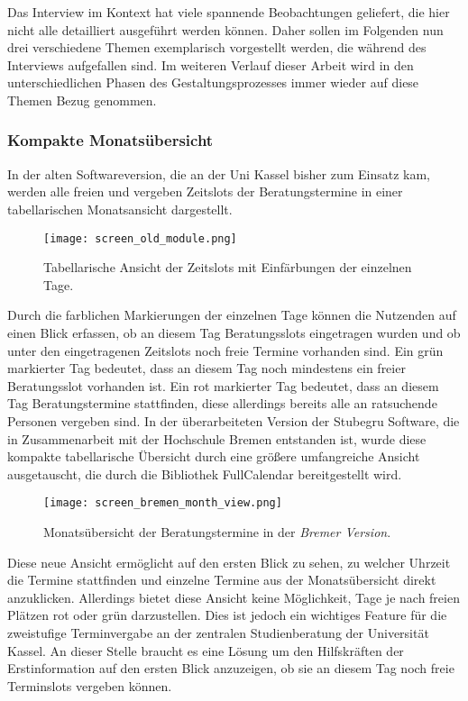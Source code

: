 Das Interview im Kontext hat viele spannende Beobachtungen geliefert, die hier
nicht alle detailliert ausgeführt werden können. Daher sollen im Folgenden nun
drei verschiedene Themen exemplarisch vorgestellt werden, die während des
Interviews aufgefallen sind. Im weiteren Verlauf dieser Arbeit wird in den
unterschiedlichen Phasen des Gestaltungsprozesses immer wieder auf diese Themen
Bezug genommen.

\subsubsection{Kompakte Monatsübersicht}
In der alten Softwareversion, die an der Uni Kassel bisher zum Einsatz kam,
werden alle freien und vergeben Zeitslots der Beratungstermine in einer
tabellarischen Monatsansicht dargestellt.

\begin{figure}[H]
    \caption{Tabellarische Ansicht der Zeitslots mit Einfärbungen der einzelnen Tage.}
    \centering
    \texttt{[image: screen\_old\_module.png]}
\end{figure}

Durch die farblichen Markierungen der einzelnen Tage können die Nutzenden auf einen
Blick erfassen, ob an diesem Tag Beratungsslots eingetragen wurden und ob unter
den eingetragenen Zeitslots noch freie Termine vorhanden sind. Ein grün
markierter Tag bedeutet, dass an diesem Tag noch mindestens ein freier
Beratungsslot vorhanden ist. Ein rot markierter Tag bedeutet, dass an diesem
Tag Beratungstermine stattfinden, diese allerdings bereits alle an ratsuchende
Personen vergeben sind. In der überarbeiteten Version der Stubegru Software,
die in Zusammenarbeit mit der Hochschule Bremen entstanden ist, wurde diese
kompakte tabellarische Übersicht durch eine größere umfangreiche Ansicht
ausgetauscht, die durch die Bibliothek \gls{FullCalendar} bereitgestellt wird.

\begin{figure}[H]
    \caption{Monatsübersicht der Beratungstermine in der \textit{Bremer Version}.}
    \centering
    \texttt{[image: screen\_bremen\_month\_view.png]}
\end{figure}

Diese neue Ansicht ermöglicht auf den ersten Blick zu sehen, zu welcher Uhrzeit
die Termine stattfinden und einzelne Termine aus der Monatsübersicht direkt
anzuklicken. Allerdings bietet diese Ansicht keine Möglichkeit, Tage je nach
freien Plätzen rot oder grün darzustellen. Dies ist jedoch ein wichtiges
Feature für die zweistufige Terminvergabe an der zentralen Studienberatung der
Universität Kassel. An dieser Stelle braucht es eine Lösung um den Hilfskräften
der Erstinformation auf den ersten Blick anzuzeigen, ob sie an diesem Tag noch
freie Terminslots vergeben können.

